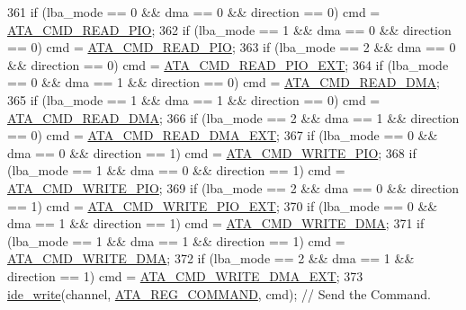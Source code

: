 \begin{DoxyCode}
361     \textcolor{keywordflow}{if} (lba\_mode == 0 && dma == 0 && direction == 0) cmd = \hyperlink{a00032_a91a96db8427a8caa254a218f05dcb3f4_a91a96db8427a8caa254a218f05dcb3f4}{ATA\_CMD\_READ\_PIO};
362     \textcolor{keywordflow}{if} (lba\_mode == 1 && dma == 0 && direction == 0) cmd = \hyperlink{a00032_a91a96db8427a8caa254a218f05dcb3f4_a91a96db8427a8caa254a218f05dcb3f4}{ATA\_CMD\_READ\_PIO};   
363     \textcolor{keywordflow}{if} (lba\_mode == 2 && dma == 0 && direction == 0) cmd = \hyperlink{a00032_a3165497b4d8eb30297a4d62e39846b01_a3165497b4d8eb30297a4d62e39846b01}{ATA\_CMD\_READ\_PIO\_EXT};   
364     \textcolor{keywordflow}{if} (lba\_mode == 0 && dma == 1 && direction == 0) cmd = \hyperlink{a00032_aefab351e75e10b6dbfa0b7828031cda4_aefab351e75e10b6dbfa0b7828031cda4}{ATA\_CMD\_READ\_DMA};
365     \textcolor{keywordflow}{if} (lba\_mode == 1 && dma == 1 && direction == 0) cmd = \hyperlink{a00032_aefab351e75e10b6dbfa0b7828031cda4_aefab351e75e10b6dbfa0b7828031cda4}{ATA\_CMD\_READ\_DMA};
366     \textcolor{keywordflow}{if} (lba\_mode == 2 && dma == 1 && direction == 0) cmd = \hyperlink{a00032_a42247550c708b2b7852927180c7dde78_a42247550c708b2b7852927180c7dde78}{ATA\_CMD\_READ\_DMA\_EXT};
367     \textcolor{keywordflow}{if} (lba\_mode == 0 && dma == 0 && direction == 1) cmd = \hyperlink{a00032_a64f2c50b916f1f67018c36f75f811cc7_a64f2c50b916f1f67018c36f75f811cc7}{ATA\_CMD\_WRITE\_PIO};
368     \textcolor{keywordflow}{if} (lba\_mode == 1 && dma == 0 && direction == 1) cmd = \hyperlink{a00032_a64f2c50b916f1f67018c36f75f811cc7_a64f2c50b916f1f67018c36f75f811cc7}{ATA\_CMD\_WRITE\_PIO};
369     \textcolor{keywordflow}{if} (lba\_mode == 2 && dma == 0 && direction == 1) cmd = \hyperlink{a00032_ac8e433782c7125e6929673907eca6f17_ac8e433782c7125e6929673907eca6f17}{ATA\_CMD\_WRITE\_PIO\_EXT};
370     \textcolor{keywordflow}{if} (lba\_mode == 0 && dma == 1 && direction == 1) cmd = \hyperlink{a00032_a41dc931ac3c2c6733a2a67d03eaf1674_a41dc931ac3c2c6733a2a67d03eaf1674}{ATA\_CMD\_WRITE\_DMA};
371     \textcolor{keywordflow}{if} (lba\_mode == 1 && dma == 1 && direction == 1) cmd = \hyperlink{a00032_a41dc931ac3c2c6733a2a67d03eaf1674_a41dc931ac3c2c6733a2a67d03eaf1674}{ATA\_CMD\_WRITE\_DMA};
372     \textcolor{keywordflow}{if} (lba\_mode == 2 && dma == 1 && direction == 1) cmd = \hyperlink{a00032_a3a75d9e39518e704f3a4b39e6a3d998c_a3a75d9e39518e704f3a4b39e6a3d998c}{ATA\_CMD\_WRITE\_DMA\_EXT};
373     \hyperlink{a00032_afdb22c37a32d86fcb64e55b3edab4790_afdb22c37a32d86fcb64e55b3edab4790}{ide\_write}(channel, \hyperlink{a00032_a1a54069e05845badff84e1490ca4681e_a1a54069e05845badff84e1490ca4681e}{ATA\_REG\_COMMAND}, cmd);               \textcolor{comment}{// Send the Command.}

\end{DoxyCode}
